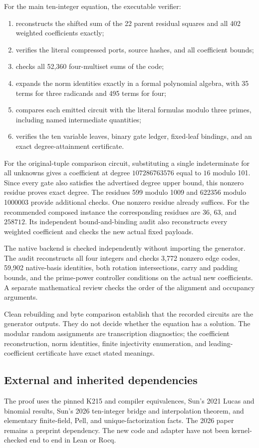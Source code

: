 \documentclass[11pt,a4paper]{article}
\theoremstyle{definition}
\begin{document}
For the main ten-integer equation, the executable verifier:
\begin{enumerate}
\item reconstructs the shifted sum of the 22 parent residual
squares and all 402 weighted coefficients exactly;
\item verifies the literal compressed ports, source hashes, and
all coefficient bounds;
\item checks all 52,360 four-multiset sums of the code;
\item expands the norm identities exactly in a formal polynomial
algebra, with 35 terms for three radicands and 495 terms for four;
\item compares each emitted circuit with the literal formulas
modulo three primes, including named intermediate quantities;
\item verifies the ten variable leaves, binary gate ledger,
fixed-leaf bindings, and an exact degree-attainment certificate.
\end{enumerate}
For the original-tuple comparison circuit, substituting a single indeterminate for
all unknowns gives a coefficient at degree $107286763576$ equal
to $16$ modulo 101. Since every gate also satisfies the advertised
degree upper bound, this nonzero residue proves exact degree.
The residues 599 modulo 1009 and 622356 modulo 1000003 provide
additional checks. One nonzero residue already suffices.
For the recommended composed instance the corresponding residues
are $36$, $63$, and $258712$. Its independent bound-and-binding
audit also reconstructs every weighted coefficient and checks
the new actual fixed payloads.

The native backend is checked independently without importing
the generator. The audit reconstructs all four integers and
checks 3,772 nonzero edge codes, 59,902 native-basis identities,
both rotation intersections, carry and padding bounds, and the
prime-power controller conditions on the actual new coefficients.
A separate mathematical review checks the order of the alignment
and occupancy arguments.

Clean rebuilding and byte comparison establish that the recorded
circuits are the generator outputs. They do not decide whether
the equation has a solution. The modular random assignments are
transcription diagnostics; the coefficient reconstruction, norm
identities, finite injectivity enumeration, and leading-coefficient
certificate have exact stated meanings.

\subsection{External and inherited dependencies}
The proof uses the pinned K215 and compiler equivalences, Sun's
2021 Lucas and binomial results, Sun's 2026 ten-integer bridge
and interpolation theorem, and elementary finite-field, Pell,
and unique-factorization facts. The 2026 paper remains a preprint
dependency. The new code and adapter have not been kernel-checked
end to end in Lean or Rocq.
\end{document}

